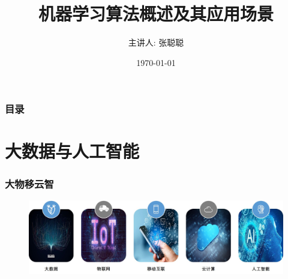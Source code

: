 \documentclass[10pt,aspectratio=43,mathserif,table]{beamer}
\title{机器学习算法概述及其应用场景}
\author{主讲人: 张聪聪}
\institute{\fontsize{8pt}{14pt}华润智慧能源有限公司}
\date{\today}
\begin{document}
\frame{\titlepage}
\section[目录]{}   %
\begin{frame}[allowframebreaks]
	\frametitle{目录}
	\tableofcontents
\end{frame}

\section{大数据与人工智能}
\begin{frame}
	\frametitle{大物移云智}
	\begin{figure}[]
		\centering
		\includegraphics[width=1\textwidth]{figures/b_lot.jpg}
		\label{}
	\end{figure}
\end{frame}
\end{document}
